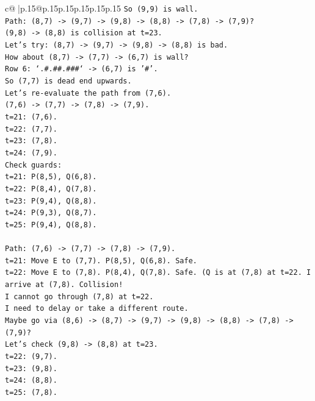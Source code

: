 \documentclass{article}
\begin{document}
{\begin{supertabular}{c@{$\;$}|p{.15\linewidth}@{}p{.15\linewidth}p{.15\linewidth}p{.15\linewidth}p{.15\linewidth}p{.15\linewidth}}
{{{\texttt{So (9,9) is wall.} \\
\texttt{Path: (8,7) {-}> (9,7) {-}> (9,8) {-}> (8,8) {-}> (7,8) {-}> (7,9)?} \\
\texttt{(9,8) {-}> (8,8) is collision at t=23.} \\
\texttt{Let's try: (8,7) {-}> (9,7) {-}> (9,8) {-}> (8,8) is bad.} \\
\texttt{How about (8,7) {-}> (7,7) {-}> (6,7) is wall?} \\
\texttt{Row 6: `.\#.\#\#.\#\#\#` {-}> (6,7) is '\#'.} \\
\texttt{So (7,7) is dead end upwards.} \\
\texttt{Let's re{-}evaluate the path from (7,6).} \\
\texttt{(7,6) {-}> (7,7) {-}> (7,8) {-}> (7,9).} \\
\texttt{t=21: (7,6).} \\
\texttt{t=22: (7,7).} \\
\texttt{t=23: (7,8).} \\
\texttt{t=24: (7,9).} \\
\texttt{Check guards:} \\
\texttt{t=21: P(8,5), Q(6,8).} \\
\texttt{t=22: P(8,4), Q(7,8).} \\
\texttt{t=23: P(9,4), Q(8,8).} \\
\texttt{t=24: P(9,3), Q(8,7).} \\
\texttt{t=25: P(9,4), Q(8,8).} \\
\\ 
\texttt{Path: (7,6) {-}> (7,7) {-}> (7,8) {-}> (7,9).} \\
\texttt{t=21: Move E to (7,7). P(8,5), Q(6,8). Safe.} \\
\texttt{t=22: Move E to (7,8). P(8,4), Q(7,8). Safe. (Q is at (7,8) at t=22. I arrive at (7,8). Collision!} \\
\texttt{I cannot go through (7,8) at t=22.} \\
\texttt{I need to delay or take a different route.} \\
\texttt{Maybe go via (8,6) {-}> (8,7) {-}> (9,7) {-}> (9,8) {-}> (8,8) {-}> (7,8) {-}> (7,9)?} \\
\texttt{Let's check (9,8) {-}> (8,8) at t=23.} \\
\texttt{t=22: (9,7).} \\
\texttt{t=23: (9,8).} \\
\texttt{t=24: (8,8).} \\
\texttt{t=25: (7,8).} \\
}}}
\end{supertabular}}
\end{document}
